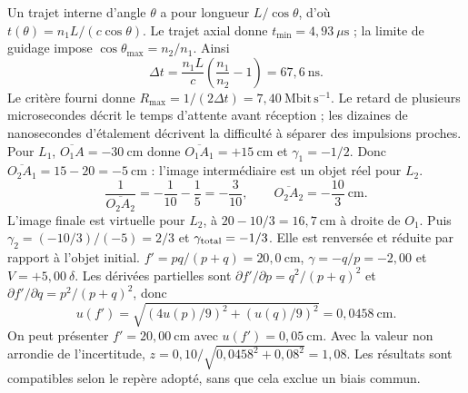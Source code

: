 Un trajet interne d'angle $\theta$ a pour longueur $L/\cos\theta$, d'où $t(\theta)=n_1L/(c\cos\theta)$. Le trajet axial donne $t_{\min}=4{,}93\ \mu\mathrm{s}$ ; la limite de guidage impose $\cos\theta_{\max}=n_2/n_1$. Ainsi
\[\Delta t=\frac{n_1L}{c}\left(\frac{n_1}{n_2}-1\right)=67{,}6\ \mathrm{ns}.\]
Le critère fourni donne $R_{\max}=1/(2\Delta t)=7{,}40\ \mathrm{Mbit\,s^{-1}}$. Le retard de plusieurs microsecondes décrit le temps d'attente avant réception ; les dizaines de nanosecondes d'étalement décrivent la difficulté à séparer des impulsions proches.
Pour $L_1$, $\overline{O_1A}=-30\ \mathrm{cm}$ donne $\overline{O_1A_1}=+15\ \mathrm{cm}$ et $\gamma_1=-1/2$. Donc $\overline{O_2A_1}=15-20=-5\ \mathrm{cm}$ : l'image intermédiaire est un objet réel pour $L_2$.
\[\frac1{\overline{O_2A_2}}=-\frac1{10}-\frac15=-\frac3{10},\qquad
\overline{O_2A_2}=-\frac{10}{3}\ \mathrm{cm}.\]
L'image finale est virtuelle pour $L_2$, à $20-10/3=16{,}7\ \mathrm{cm}$ à droite de $O_1$. Puis $\gamma_2=(-10/3)/(-5)=2/3$ et $\gamma_{\rm total}=-1/3$. Elle est renversée et réduite par rapport à l'objet initial.
$f'=pq/(p+q)=20{,}0\ \mathrm{cm}$, $\gamma=-q/p=-2{,}00$ et $V=+5{,}00\ \delta$. Les dérivées partielles sont $\partial f'/\partial p=q^2/(p+q)^2$ et $\partial f'/\partial q=p^2/(p+q)^2$, donc
\[u(f')=\sqrt{(4u(p)/9)^2+(u(q)/9)^2}=0{,}0458\ \mathrm{cm}.\]
On peut présenter $f'=20{,}00\ \mathrm{cm}$ avec $u(f')=0{,}05\ \mathrm{cm}$. Avec la valeur non arrondie de l'incertitude, $z=0{,}10/\sqrt{0{,}0458^2+0{,}08^2}=1{,}08$. Les résultats sont compatibles selon le repère adopté, sans que cela exclue un biais commun.

